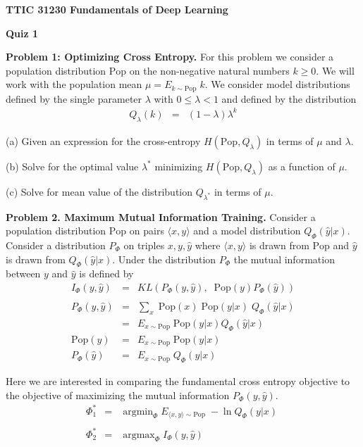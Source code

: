 \documentclass{article}
\newcommand{\pop}{\mathrm{Pop}}
\DeclareMathOperator*{\argmin}{argmin}
\DeclareMathOperator*{\argmax}{argmax}
\newcommand{\tuple}[1]{{\mbox{$\langle#1\rangle$}}}
\begin{document}
\centerline{\bf TTIC 31230 Fundamentals of Deep Learning}
\centerline{\bf Quiz 1}

\vfill
\vfill
    {\bf Problem 1: Optimizing Cross Entropy.} For this problem we consider a population distribution $\pop$ on the non-negative natural numbers $k \geq 0$.
    We will work with the population mean $\mu = E_{k \sim \pop} \;k$.
We consider model distributions defined by the single parameter $\lambda$ with $0 \leq \lambda < 1$ and defined by the distribution
\begin{eqnarray*}
  Q_\lambda(k) & = & (1-\lambda)\lambda^k
\end{eqnarray*}

\medskip
(a) Given an expression for the cross-entropy $H(\pop,Q_\lambda)$ in terms of $\mu$ and $\lambda$.

\medskip
(b) Solve for the optimal value $\lambda^*$ minimizing $H(\pop,Q_\lambda)$ as a function of $\mu$.

\medskip
(c) Solve for mean value of the distribution $Q_{\lambda^*}$ in terms of $\mu$.

\bigskip
{\bf Problem 2. Maximum Mutual Information Training.} Consider a population distribution $\pop$ on pairs $\tuple{x,y}$ and a model distribution $Q_\Phi(\hat{y}|x)$.
Consider a distribution $P_\Phi$ on triples ${x,y,\hat{y}}$ where $\tuple{x,y}$ is drawn from $\pop$ and $\hat{y}$ is drawn from $Q_\Phi(\hat{y}|x)$.
Under the distribution $P_\Phi$ the mutual information between $y$ and $\hat{y}$ is defined by
\begin{eqnarray*}
  I_\Phi(y,\hat{y})& = & KL(P_\Phi(y,\hat{y}),\;\;\pop(y)P_\Phi(\hat{y})) \\
  \\
  P_\Phi(y,\hat{y}) & = & \sum_x\;\pop(x)\;\pop(y|x)\;Q_\Phi(\hat{y}|x) \\
  & = & E_{x \sim \pop}\;\pop(y|x)Q_\Phi(\hat{y}|x) \\
  \pop(y) & = & E_{x \sim \pop}\;\pop(y|x) \\
  P_\Phi(\hat{y}) & = & E_{x \sim \pop}\;Q_\Phi(y|x)
\end{eqnarray*}

Here we are interested in comparing the fundamental cross entropy objective to the objective of maximizing the mutual information $P_\Phi(y,\hat{y})$.
\begin{eqnarray*}
  \Phi^*_1 & = & \argmin_\Phi E_{\tuple{x,y}\sim \pop}\;-\ln Q_\Phi(y|x)\; \\
  \\
  \Phi^*_2 & = & \argmax_\Phi I_\Phi(y,\hat{y})
\end{eqnarray*}
\end{document}
